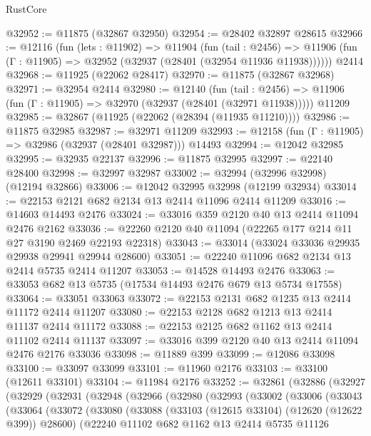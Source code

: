 \begin{lexlean}{RustCore}
\begin{coremodule}
@32952 := @11875 (@32867 @32950)
@32954 := @28402 @32897 @28615
@32966 := @12116
    (fun (lets : @11902) =>
    @11904
      (fun (tail : @2456) =>
      @11906 (fun (Γ : @11905) => @32952 (@32937 (@28401 (@32954 @11936 @11938))))))
    @2414
@32968 := @11925 (@22062 @28417)
@32970 := @11875 (@32867 @32968)
@32971 := @32954 @2414
@32980 := @12140
    (fun (tail : @2456) => @11906 (fun (Γ : @11905) => @32970 (@32937 (@28401 (@32971 @11938)))))
    @11209
@32985 := @32867 (@11925 (@22062 (@28394 (@11935 @11210))))
@32986 := @11875 @32985
@32987 := @32971 @11209
@32993 := @12158 (fun (Γ : @11905) => @32986 (@32937 (@28401 @32987))) @14493
@32994 := @12042 @32985
@32995 := @32935 @22137
@32996 := @11875 @32995
@32997 := @22140 @28400
@32998 := @32997 @32987
@33002 := @32994 (@32996 @32998) (@12194 @32866)
@33006 := @12042 @32995 @32998 (@12199 @32934)
@33014 := @22153 @2121 @682 @2134 @13 @2414 @11096 @2414 @11209
@33016 := @14603 @14493 @2476
@33024 := @33016 @359 @2120 @40 @13 @2414 @11094 @2476 @2162
@33036 := @22260 @2120 @40 @11094 (@22265 @177 @214 @11 @27 @3190 @2469 @22193 @22318)
@33043 := @33014 (@33024 @33036 @29935 @29938 @29941 @29944 @28600)
@33051 := @22240 @11096 @682 @2134 @13 @2414 @5735 @2414 @11207
@33053 := @14528 @14493 @2476
@33063 := @33053 @682 @13 @5735 (@17534 @14493 @2476 @679 @13 @5734 @17558)
@33064 := @33051 @33063
@33072 := @22153 @2131 @682 @1235 @13 @2414 @11172 @2414 @11207
@33080 := @22153 @2128 @682 @1213 @13 @2414 @11137 @2414 @11172
@33088 := @22153 @2125 @682 @1162 @13 @2414 @11102 @2414 @11137
@33097 := @33016 @399 @2120 @40 @13 @2414 @11094 @2476 @2176 @33036
@33098 := @11889 @399
@33099 := @12086 @33098
@33100 := @33097 @33099
@33101 := @11960 @2176
@33103 := @33100 (@12611 @33101)
@33104 := @11984 @2176
@33252 := @32861
    (@32886
      (@32927
        (@32929
          (@32931
            (@32948
              (@32966
                (@32980
                  (@32993
                    (@33002
                      (@33006
                        (@33043
                          (@33064
                            (@33072
                              (@33080
                                (@33088
                                  (@33103 (@12615 @33104) (@12620 (@12622 @399)) @28600)
                                  (@22240
                                    @11102
                                    @682
                                    @1162
                                    @13
                                    @2414
                                    @5735
                                    @11126

\end{coremodule}
\end{lexlean}
